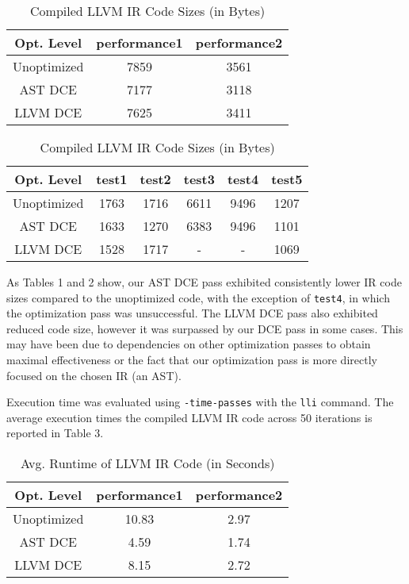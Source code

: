 \documentclass[sigconf]{acmart}
\begin{document}
\begin{table}
  \caption{Compiled LLVM IR Code Sizes (in Bytes)}
  \label{tab:freq}
  \begin{tabular}{ccc}
    \toprule
    Opt. Level&performance1&performance2\\
    \midrule
    Unoptimized&7859&3561\\
    AST DCE&7177&3118\\
    LLVM DCE&7625&3411\\
  \bottomrule
\end{tabular}
\end{table}

\begin{table}
  \caption{Compiled LLVM IR Code Sizes (in Bytes)}
  \label{tab:freq}
  \begin{tabular}{cccccc}
    \toprule
    Opt. Level&test1&test2&test3&test4&test5\\
    \midrule
    Unoptimized&1763&1716&6611&9496&1207\\
    AST DCE&1633&1270&6383&9496&1101\\
    LLVM DCE&1528&1717&-&-&1069\\
  \bottomrule
\end{tabular}
\end{table}

As Tables 1 and 2 show, our AST DCE pass exhibited consistently lower IR code sizes compared to the unoptimized code, with the exception of \verb|test4|, in which the optimization pass was unsuccessful. The LLVM DCE pass also exhibited reduced code size, however it was surpassed by our DCE pass in some cases. This may have been due to dependencies on other optimization passes to obtain maximal effectiveness or the fact that our optimization pass is more directly focused on the chosen IR (an AST).

Execution time was evaluated using \verb|-time-passes| with the \verb|lli| command. The average execution times the compiled LLVM IR code across 50 iterations is reported in Table 3.

\begin{table}
  \caption{Avg. Runtime of LLVM IR Code (in Seconds)}
  \label{tab:freq}
  \begin{tabular}{ccc}
    \toprule
    Opt. Level&performance1&performance2\\
    \midrule
    Unoptimized&10.83&2.97\\
    AST DCE&4.59&1.74\\
    LLVM DCE&8.15&2.72\\
  \bottomrule
\end{tabular}
\end{table}
\end{document}
